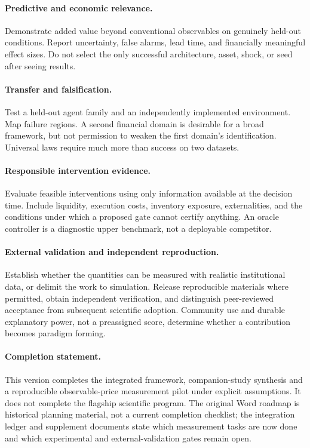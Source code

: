 \documentclass[11pt,a4paper]{article}
\theoremstyle{definition}
\theoremstyle{remark}
\begin{document}
\paragraph{Predictive and economic relevance.}
Demonstrate added value beyond conventional observables on genuinely held-out conditions. Report uncertainty, false alarms, lead time, and financially meaningful effect sizes. Do not select the only successful architecture, asset, shock, or seed after seeing results.

\paragraph{Transfer and falsification.}
Test a held-out agent family and an independently implemented environment. Map failure regions. A second financial domain is desirable for a broad framework, but not permission to weaken the first domain's identification. Universal laws require much more than success on two datasets.

\paragraph{Responsible intervention evidence.}
Evaluate feasible interventions using only information available at the decision time. Include liquidity, execution costs, inventory exposure, externalities, and the conditions under which a proposed gate cannot certify anything. An oracle controller is a diagnostic upper benchmark, not a deployable competitor.

\paragraph{External validation and independent reproduction.}
Establish whether the quantities can be measured with realistic institutional data, or delimit the work to simulation. Release reproducible materials where permitted, obtain independent verification, and distinguish peer-reviewed acceptance from subsequent scientific adoption. Community use and durable explanatory power, not a preassigned score, determine whether a contribution becomes paradigm forming.

\paragraph{Completion statement.}
This version completes the integrated framework, companion-study synthesis and a reproducible observable-price measurement pilot under explicit assumptions. It does not complete the flagship scientific program. The original Word roadmap is historical planning material, not a current completion checklist; the integration ledger and supplement documents state which measurement tasks are now done and which experimental and external-validation gates remain open.
\end{document}
